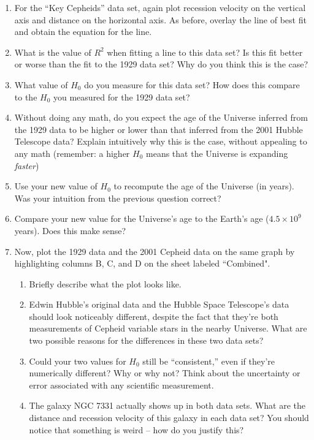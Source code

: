 \documentclass[11pt]{article}
\begin{document}
\begin{enumerate}
    \item For the ``Key Cepheids'' data set, again plot recession velocity on the vertical axis and distance on the horizontal axis. As before, overlay the line of best fit and obtain the equation for the line.
    
    \item What is the value of $R^2$ when fitting a line to this data set? Is this fit better or worse than the fit to the 1929 data set? Why do you think this is the case?
    
    \item What value of $H_0$ do you measure for this data set? How does this compare to the $H_0$ you measured for the 1929 data set? 
    
    \item Without doing any math, do you expect the age of the Universe inferred from the 1929 data to be higher or lower than that inferred from the 2001 Hubble Telescope data? Explain intuitively why this is the case, without appealing to any math (remember: a higher $H_0$ means that the Universe is expanding \emph{faster})
    
    \item Use your new value of $H_0$ to recompute the age of the Universe (in years). Was your intuition from the previous question correct?
    
    \item Compare your new value for the Universe's age to the Earth's age ($4.5 \times 10^9$ years). Does this make sense? 
    
    \item Now, plot the 1929 data and the 2001 Cepheid data on the same graph by highlighting columns B, C, and D on the sheet labeled ``Combined". 
    \begin{enumerate}
        \item Briefly describe what the plot looks like.
        
        \item Edwin Hubble's original data and the Hubble Space Telescope's data should look noticeably different, despite the fact that they're both measurements of Cepheid variable stars in the nearby Universe. What are two possible reasons for the differences in these two data sets?
        
        \item Could your two values for $H_0$ still be ``consistent,'' even if they're numerically different? Why or why not? Think about the uncertainty or error associated with any scientific measurement. 
        
        \item The galaxy NGC 7331 actually shows up in both data sets. What are the distance and recession velocity of this galaxy in each data set? You should notice that something is weird -- how do you justify this?
    
    \end{enumerate}
\end{enumerate}
\end{document}
